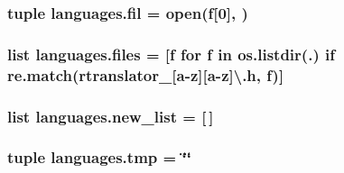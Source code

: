 \subsubsection[{fil}]{\setlength{\rightskip}{0pt plus 5cm}tuple languages.\+fil = {\bf open}({\bf f}\mbox{[}0\mbox{]}, \textquotesingle{})}\label{namespacelanguages_a77787bb82214106405ec90ddffd2e038}
\hypertarget{namespacelanguages_ab2362f8df797056a2dedc16b7ac63d2a}{}
\subsubsection[{files}]{\setlength{\rightskip}{0pt plus 5cm}list languages.\+files = \mbox{[}{\bf f} for {\bf f} in os.\+listdir(\textquotesingle{}.\textquotesingle{}) {\bf if} re.\+match({\bf r}\textquotesingle{}translator\+\_\+\mbox{[}{\bf a}-\/{\bf z}\mbox{]}\mbox{[}{\bf a}-\/{\bf z}\mbox{]}\textbackslash{}.{\bf h}\textquotesingle{}, {\bf f})\mbox{]}}\label{namespacelanguages_ab2362f8df797056a2dedc16b7ac63d2a}
\hypertarget{namespacelanguages_a08f1c639dc6ba6c9c0ded38c06a2353a}{}
\subsubsection[{new\+\_\+list}]{\setlength{\rightskip}{0pt plus 5cm}list languages.\+new\+\_\+list = \mbox{[}$\,$\mbox{]}}\label{namespacelanguages_a08f1c639dc6ba6c9c0ded38c06a2353a}
\hypertarget{namespacelanguages_a31d430dd93511d50089061f81f32c31d}{}
\subsubsection[{tmp}]{\setlength{\rightskip}{0pt plus 5cm}tuple languages.\+tmp = \char`\"{}\char`\"{}}\label{namespacelanguages_a31d430dd93511d50089061f81f32c31d}
